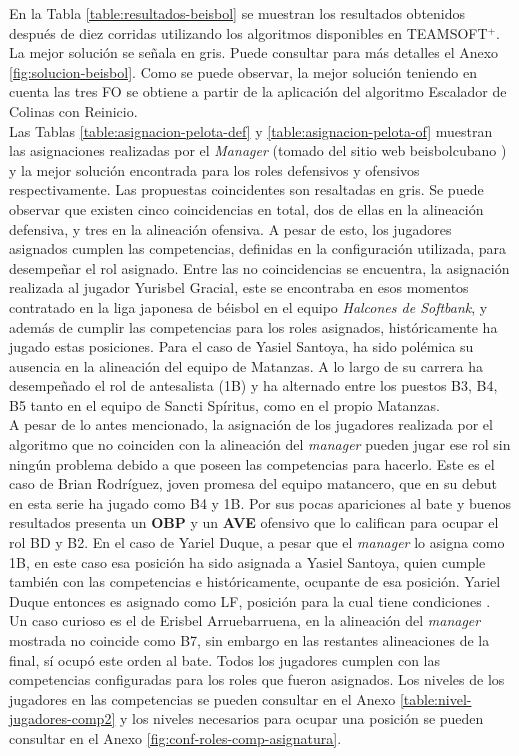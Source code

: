 En la Tabla \ref{table:resultados-beisbol} se muestran los resultados obtenidos después de diez corridas utilizando los algoritmos disponibles en TEAMSOFT$^+$. La mejor solución se señala en gris. Puede consultar para más detalles el Anexo \ref{fig:solucion-beisbol}. Como se puede observar, la mejor solución teniendo en cuenta las tres FO se obtiene a partir de la aplicación del algoritmo Escalador de Colinas con Reinicio. \\

Las Tablas \ref{table:asignacion-pelota-def} y \ref{table:asignacion-pelota-of} muestran las asignaciones realizadas por el \textit{Manager} (tomado del sitio web beisbolcubano \cite{SN21}) y la mejor solución encontrada para los roles defensivos y ofensivos respectivamente. Las propuestas coincidentes son resaltadas en gris. Se puede observar que existen cinco coincidencias en total, dos de ellas en la alineación defensiva, y tres en la alineación ofensiva. A pesar de esto, los jugadores asignados cumplen las competencias, definidas en la configuración utilizada, para desempeñar el rol asignado. Entre las no coincidencias se encuentra, la asignación realizada al jugador Yurisbel Gracial, este se encontraba en esos momentos contratado en la liga japonesa de béisbol en el equipo \textit{Halcones de Softbank}, y además de cumplir las competencias para los roles asignados, históricamente ha jugado estas posiciones. Para el caso de Yasiel Santoya, ha sido polémica su ausencia en la alineación del equipo de Matanzas. A lo largo de su carrera ha desempeñado el rol de antesalista (1B) y ha alternado entre los puestos B3, B4, B5 tanto en el equipo de Sancti Spíritus, como en el propio Matanzas. \\

A pesar de lo antes mencionado, la asignación de los jugadores realizada por el algoritmo que no coinciden con la alineación del \textit{manager} pueden jugar ese rol sin ningún problema debido a que poseen las competencias para hacerlo. Este es el caso de Brian Rodríguez, joven promesa del equipo matancero, que en su debut en esta serie ha jugado como B4 y 1B. Por sus pocas apariciones al bate y buenos resultados presenta un \textbf{OBP} y un \textbf{AVE} ofensivo que lo califican para ocupar el rol BD y B2. En el caso de Yariel Duque, a pesar que el \textit{manager} lo asigna como 1B, en este caso esa posición ha sido asignada a Yasiel Santoya, quien cumple también con las competencias e históricamente, ocupante de esa posición. Yariel Duque entonces es asignado como LF, posición para la cual tiene condiciones \cite{RofesPerez2016}. Un caso curioso es el de Erisbel Arruebarruena, en la alineación del \textit{manager} mostrada no coincide como B7, sin embargo en las restantes alineaciones de la final, sí ocupó este orden al bate. Todos los jugadores cumplen con las competencias configuradas para los roles que fueron asignados. Los niveles de los jugadores en las competencias se pueden consultar en el Anexo \ref{table:nivel-jugadores-comp2} y los niveles necesarios para ocupar una posición se pueden consultar en el Anexo \ref{fig:conf-roles-comp-asignatura}.


